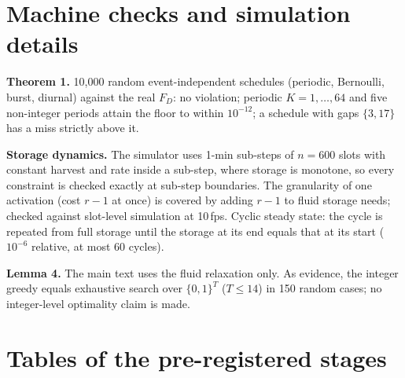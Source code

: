 \documentclass[10pt]{article}
\begin{document}
\section{Machine checks and simulation details}
\textbf{Theorem 1.} 10{,}000 random event-independent schedules (periodic, Bernoulli, burst, diurnal) against the real $F_D$: no violation; periodic $K=1,\dots,64$ and five non-integer periods attain the floor to within $10^{-12}$; a schedule with gaps $\{3,17\}$ has a miss strictly above it.

\textbf{Storage dynamics.} The simulator uses 1-min sub-steps of $n=600$ slots with constant harvest and rate inside a sub-step, where storage is monotone, so every constraint is checked exactly at sub-step boundaries. The granularity of one activation (cost $r-1$ at once) is covered by adding $r-1$ to fluid storage needs; checked against slot-level simulation at 10\,fps. Cyclic steady state: the cycle is repeated from full storage until the storage at its end equals that at its start ($10^{-6}$ relative, at most 60 cycles).

\textbf{Lemma 4.} The main text uses the fluid relaxation only. As evidence, the integer greedy equals exhaustive search over $\{0,1\}^T$ ($T\le14$) in 150 random cases; no integer-level optimality claim is made.

\section{Tables of the pre-registered stages}

\end{document}
